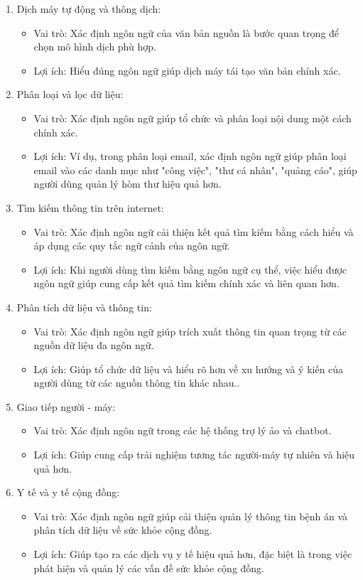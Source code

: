 \begin{enumerate}

    \item Dịch máy tự động và thông dịch:
    \begin{itemize}
        \item Vai trò: Xác định ngôn ngữ của văn bản nguồn là bước quan trọng để chọn mô hình dịch phù hợp.
        \item  Lợi ích: Hiểu đúng ngôn ngữ giúp dịch máy tái tạo văn bản chính xác. 
    \end{itemize}
    \clearpage
    \item Phân loại và lọc dữ liệu:
    \begin{itemize}
        \item Vai trò: Xác định ngôn ngữ giúp tổ chức và phân loại nội dung một cách chính xác.
        \item Lợi ích: Ví dụ, trong phân loại email, xác định ngôn ngữ giúp phân loại email vào các danh mục như "công việc", "thư cá nhân", "quảng cáo", giúp người dùng quản lý hòm thư hiệu quả hơn.
    \end{itemize} 
    \item Tìm kiếm thông tin trên internet:
    \begin{itemize}
        \item Vai trò: Xác định ngôn ngữ cải thiện kết quả tìm kiếm bằng cách hiểu và áp dụng các quy tắc ngữ cảnh của ngôn ngữ.
        \item Lợi ích: Khi người dùng tìm kiếm bằng ngôn ngữ cụ thể, việc hiểu được ngôn ngữ giúp cung cấp kết quả tìm kiếm chính xác và liên quan hơn.
    \end{itemize}
    \item Phân tích dữ liệu và thông tin:
    \begin{itemize}
        \item Vai trò: Xác định ngôn ngữ giúp trích xuất thông tin quan trọng từ các nguồn dữ liệu đa ngôn ngữ.
        \item  Lợi ích: Giúp tổ chức dữ liệu và hiểu rõ hơn về xu hướng và ý kiến của người dùng từ các nguồn thông tin khác nhau..
    \end{itemize}
    \item Giao tiếp người - máy:
    \begin{itemize}
        \item Vai trò: Xác định ngôn ngữ trong các hệ thống trợ lý ảo và chatbot.
        \item Lợi ích: Giúp cung cấp trải nghiệm tương tác người-máy tự nhiên và hiệu quả hơn.
    \end{itemize}
    \item Y tế và y tế cộng đồng:
    \begin{itemize}
        \item  Vai trò: Xác định ngôn ngữ giúp cải thiện quản lý thông tin bệnh án và phân tích dữ liệu về sức khỏe cộng đồng.
        \item Lợi ích: Giúp tạo ra các dịch vụ y tế hiệu quả hơn, đặc biệt là trong việc phát hiện và quản lý các vấn đề sức khỏe cộng đồng.
    \end{itemize}
    
\end{enumerate}
\clearpage
